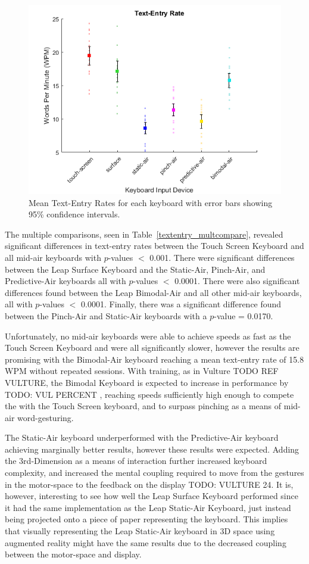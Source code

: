 \begin{figure}[h]
	\centering
	\includegraphics{fig_textentry_mean}
	\caption[Mean Text-Entry Rates]{Mean Text-Entry Rates for each keyboard with error bars showing 95\% confidence intervals.}
	\label{fig_textentry_mean}
\end{figure}

The multiple comparisons, seen in Table~\ref{textentry_multcompare}, revealed significant differences in text-entry rates between the Touch Screen Keyboard and all mid-air keyboards with $p$-values $<$ 0.001. There were significant differences between the Leap Surface Keyboard and the Static-Air, Pinch-Air, and Predictive-Air keyboards all with $p$-values $<$ 0.0001. There were also significant differences found between the Leap Bimodal-Air and all other mid-air keyboards, all with $p$-values $<$ 0.0001. Finally, there was a significant difference found between the Pinch-Air and Static-Air keyboards with a $p$-value = 0.0170.

Unfortunately, no mid-air keyboards were able to achieve speeds as fast as the Touch Screen Keyboard and were all significantly slower, however the results are promising with the Bimodal-Air keyboard reaching a mean text-entry rate of 15.8 WPM without repeated sessions. With training, as in Vulture TODO REF VULTURE, the Bimodal Keyboard is expected to increase in performance by TODO: VUL PERCENT , reaching speeds sufficiently high enough to compete the with the Touch Screen keyboard, and to surpass pinching as a means of mid-air word-gesturing.

The Static-Air keyboard underperformed with the Predictive-Air keyboard achieving marginally better results, however these results were expected. Adding the 3rd-Dimension as a means of interaction further increased keyboard complexity, and increased the mental coupling required to move from the gestures in the motor-space to the feedback on the display TODO: VULTURE 24. It is, however, interesting to see how well the Leap Surface Keyboard performed since it had the same implementation as the Leap Static-Air Keyboard, just instead being projected onto a piece of paper representing the keyboard. This implies that visually representing the Leap Static-Air keyboard in 3D space using augmented reality might have the same results due to the decreased coupling between the motor-space and display.

